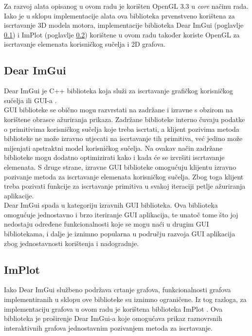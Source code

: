 \documentclass[times, utf8, diplomski]{fer}
\begin{document}
Za razvoj alata opisanog u ovom radu je korišten OpenGL 3.3 u \textit{core} načinu rada. Iako je u sklopu implementacije alata ova biblioteka prvenstveno korištena za iscrtavanje 3D modela motora, implementacije biblioteka Dear ImGui (poglavlje \ref{imgui-section}) i ImPlot (poglavlje \ref{implot-section}) korištene u ovom radu također koriste OpenGL za iscrtavanje elemenata korisničkog sučelja i 2D grafova.

\subsection{Dear ImGui} \label{imgui-section}
Dear ImGui \citep{imgui} je C++ biblioteka koja služi za iscrtavanje grafičkog korisničkog sučelja ili GUI-a .\\

GUI biblioteke se obično mogu razvrstati na zadržane  i izravne  s obzirom na korištene obrasce ažuriranja prikaza. Zadržane biblioteke interno čuvaju podatke o primitivima korisničkog sučelja koje treba iscrtati, a klijent pozivima metoda biblioteke ne može izravno utjecati na iscrtavanje tih primitiva, već jedino može mijenjati apstraktni model korisničkog sučelja. Na ovakav način zadržane biblioteke mogu dodatno optimizirati kako i kada će se izvršiti iscrtavanje elemenata. S druge strane, izravne GUI biblioteke omogućuju klijentu izravno pozivanje metoda za iscrtavanje elemenata korisničkog sučelja. Zbog toga klijent treba pozivati funkcije za iscrtavanje primitiva u svakoj iteraciji petlje ažuriranja aplikacije.\\

Dear ImGui spada u kategoriju izravnih GUI biblioteka. Ova biblioteka omogućuje jednostavno i brzo iteriranje GUI aplikacija, te unatoč tome što joj nedostaju određene funkcionalnosti koje se mogu naći u drugim GUI bibliotekama, i dalje je iznimno popularna u području razvoja GUI aplikacija zbog jednostavnosti korištenja i nadogradnje.

\subsection{ImPlot} \label{implot-section}

Iako Dear ImGui službeno podržava crtanje grafova, funkcionalnosti grafova implementiranih u sklopu ove biblioteke su iznimno ograničene. Iz tog razloga, za implementaciju grafova u ovom radu je korištena biblioteka ImPlot \citep{implot}. Ova biblioteka je proširenje Dear ImGui-a koje omogućava prikaz raznovrsnih interaktivnih grafova jednostavnim pozivanjem metoda za iscrtavanje. 
\end{document}
